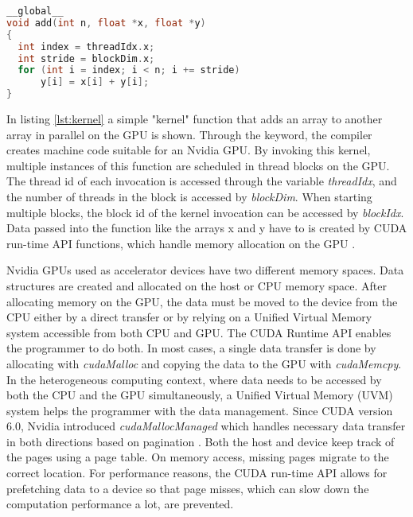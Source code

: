 \begin{lstlisting}[language=C++, caption=Simple CUDA kernel example \cite{EasyIntroductionCUDA2012}, label=lst:kernel]
__global__
void add(int n, float *x, float *y)
{
  int index = threadIdx.x;
  int stride = blockDim.x;
  for (int i = index; i < n; i += stride)
      y[i] = x[i] + y[i];
}
\end{lstlisting}
In listing \ref{lst:kernel} a simple "kernel" function that adds an array to another array in parallel on the GPU is shown. Through the \texttt{} keyword, the compiler creates machine code suitable for an Nvidia GPU. By invoking this kernel, multiple instances of this function are scheduled in thread blocks on the GPU. The thread id of each invocation is accessed through the variable \emph{threadIdx}, and the number of threads in the block is accessed by \emph{blockDim}. When starting multiple blocks, the block id of the kernel invocation can be accessed by \emph{blockIdx}.
Data passed into the function like the arrays x and y have to is created by CUDA run-time API functions, which handle memory allocation on the GPU \cite{MemoryManagement}.

Nvidia GPUs used as accelerator devices have two different memory spaces. Data structures are created and allocated on the host or CPU memory space. After allocating memory on the GPU, the data must be moved to the device from the CPU either by a direct transfer or by relying on a Unified Virtual Memory system accessible from both CPU and GPU. The CUDA Runtime API enables the programmer to do both. In most cases, a single data transfer is done by allocating with \emph{cudaMalloc} and copying the data to the GPU with \emph{cudaMemcpy}. In the heterogeneous computing context, where data needs to be accessed by both the CPU and the GPU simultaneously, a Unified Virtual Memory (UVM) system helps the programmer with the data management. Since CUDA version 6.0, Nvidia introduced \emph{cudaMallocManaged} which handles necessary data transfer in both directions based on pagination \cite{gayatriComparingManagedMemory}. Both the host and device keep track of the pages using a page table. On memory access, missing pages migrate to the correct location.
For performance reasons, the CUDA run-time API allows for prefetching data to a device so that page misses, which can slow down the computation performance a lot, are prevented.


